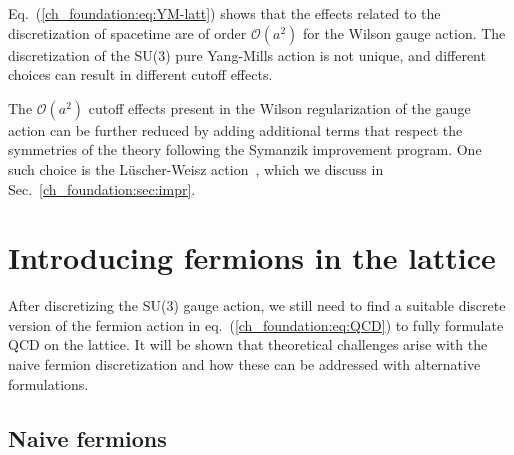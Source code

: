 Eq.~(\ref{ch_foundation:eq:YM-latt}) shows that the effects related to the discretization of spacetime are of order $\mathcal{O}(a^2)$ for the Wilson gauge action. The discretization of the SU(3) pure Yang-Mills action is not unique, and different choices can result in different cutoff effects.

The $\mathcal{O}(a^2)$ cutoff effects present in the Wilson regularization of the gauge action can be further reduced by adding additional terms that respect the symmetries of the theory following the Symanzik improvement program. One such choice is the Lüscher-Weisz action~\cite{}, which we discuss in Sec.~\ref{ch_foundation:sec:impr}.



\section{Introducing fermions in the lattice}
\label{ch_foundation:sec:Fermions}


After discretizing the SU(3) gauge action, we still need to find a suitable discrete version of the fermion action in eq.~(\ref{ch_foundation:eq:QCD}) to fully formulate QCD on the lattice. It will be shown that theoretical challenges arise with the naive fermion discretization and how these can be addressed with alternative formulations.

\subsection{Naive fermions}
\label{ch_foundation:subsec:Naive}

